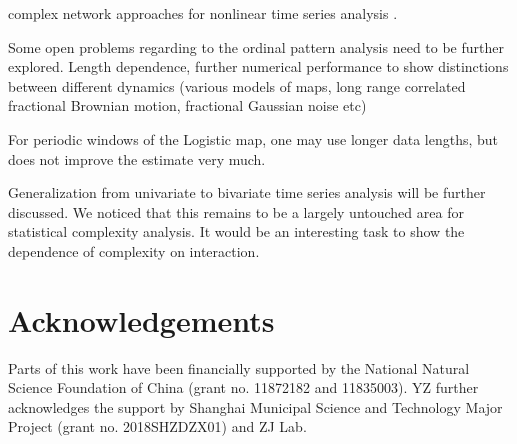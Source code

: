 \documentclass[12pt,aip,cha,reprint,nofootinbib]{revtex4-1}
\begin{document}
complex network approaches for nonlinear time series analysis \cite{ZouPR2018}. 

Some open problems regarding to the ordinal pattern analysis need to be further explored. Length dependence, further numerical performance to show distinctions between different dynamics (various models of maps, long range correlated fractional Brownian motion, fractional Gaussian noise etc)

For periodic windows of the Logistic map, one may use longer data lengths, but does not improve the estimate very much. 

Generalization from univariate to bivariate time series analysis will be further discussed. We noticed that this remains to be a largely untouched area for statistical complexity analysis. It would be an interesting task to show the dependence of complexity on interaction. 

\section*{Acknowledgements}
Parts of this work have been financially supported by the National Natural Science Foundation of China (grant no. 11872182 and 11835003). YZ further acknowledges the support by Shanghai Municipal Science and Technology Major Project (grant no. 2018SHZDZX01) and ZJ Lab. 



\end{document}
